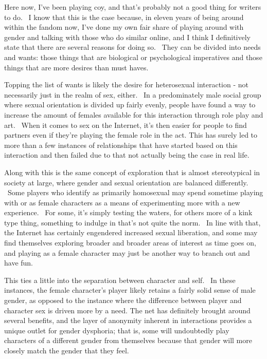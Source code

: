 Here now, I've been playing coy, and that's probably not a good thing
for writers to do. ~I know that this is the case because, in eleven
years of being around within the fandom now, I've done my own fair share
of playing around with gender and talking with those who do similar
online, and I think I definitively state that there are several reasons
for doing so. ~They can be divided into needs and wants: those things
that are biological or psychological imperatives and those things that
are more desires than must haves.

Topping the list of wants is likely the desire for heterosexual
interaction - not necessarily just in the realm of sex, either. ~In a
predominately male social group where sexual orientation is divided up
fairly evenly, people have found a way to increase the amount of females
available for this interaction through role play and art. ~When it comes
to sex on the Internet, it's then easier for people to find partners
even if they're playing the female role in the act. This has surely led
to more than a few instances of relationships that have started based on
this interaction and then failed due to that not actually being the case
in real life.

Along with this is the same concept of exploration that is almost
stereotypical in society at large, where gender and sexual orientation
are balanced differently. ~Some players who identify as primarily
homosexual may spend sometime playing with or as female characters as a
means of experimenting more with a new experience. ~For some, it's
simply testing the waters, for others more of a kink type thing,
something to indulge in that's not quite the norm. ~In line with that,
the Internet has certainly engendered increased sexual liberation, and
some may find themselves exploring broader and broader areas of interest
as time goes on, and playing as a female character may just be another
way to branch out and have fun.

This ties a little into the separation between character and self. ~In
these instances, the female character's player likely retains a fairly
solid sense of male gender, as opposed to the instance where the
difference between player and character sex is driven more by a need.
The net has definitely brought around several benefits, and the layer of
anonymity inherent in interactions provides a unique outlet for gender
dysphoria; that is, some will undoubtedly play characters of a different
gender from themselves because that gender will more closely match the
gender that they feel.

